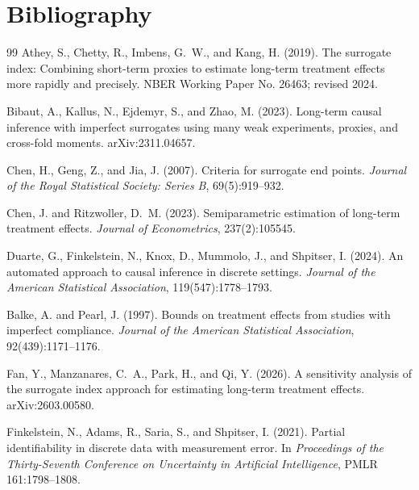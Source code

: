 \documentclass[11pt]{article}
\theoremstyle{definition}
\theoremstyle{plain}
\theoremstyle{remark}
\begin{document}
\section*{Bibliography}
\begin{thebibliography}{99}
Athey, S., Chetty, R., Imbens, G.~W., and Kang, H. (2019).
\newblock The surrogate index: Combining short-term proxies to estimate long-term treatment effects more rapidly and precisely.
\newblock NBER Working Paper No. 26463; revised 2024.

Bibaut, A., Kallus, N., Ejdemyr, S., and Zhao, M. (2023).
\newblock Long-term causal inference with imperfect surrogates using many weak experiments, proxies, and cross-fold moments.
\newblock arXiv:2311.04657.

Chen, H., Geng, Z., and Jia, J. (2007).
\newblock Criteria for surrogate end points.
\newblock \emph{Journal of the Royal Statistical Society: Series B}, 69(5):919--932.

Chen, J. and Ritzwoller, D.~M. (2023).
\newblock Semiparametric estimation of long-term treatment effects.
\newblock \emph{Journal of Econometrics}, 237(2):105545.

Duarte, G., Finkelstein, N., Knox, D., Mummolo, J., and Shpitser, I. (2024).
\newblock An automated approach to causal inference in discrete settings.
\newblock \emph{Journal of the American Statistical Association}, 119(547):1778--1793.

Balke, A. and Pearl, J. (1997).
\newblock Bounds on treatment effects from studies with imperfect compliance.
\newblock \emph{Journal of the American Statistical Association}, 92(439):1171--1176.

Fan, Y., Manzanares, C.~A., Park, H., and Qi, Y. (2026).
\newblock A sensitivity analysis of the surrogate index approach for estimating long-term treatment effects.
\newblock arXiv:2603.00580.

Finkelstein, N., Adams, R., Saria, S., and Shpitser, I. (2021).
\newblock Partial identifiability in discrete data with measurement error.
\newblock In \emph{Proceedings of the Thirty-Seventh Conference on Uncertainty in Artificial Intelligence}, PMLR 161:1798--1808.


\end{thebibliography}
\end{document}
